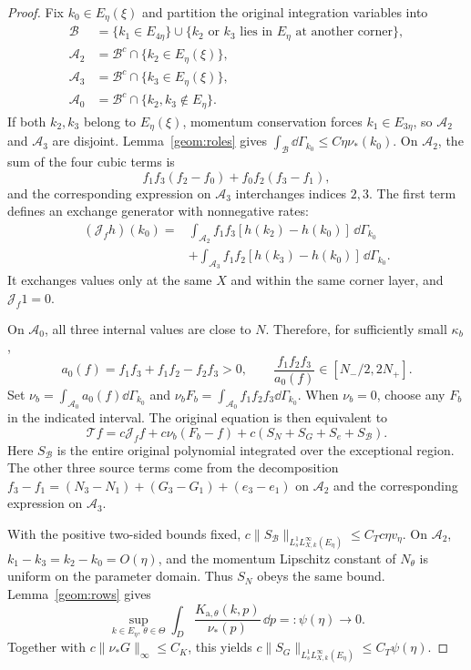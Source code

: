 \begin{proof}
 Fix $k_0\in E_\eta(\xi)$ and partition the original integration
 variables into
 \begin{align*}
 \mathcal B&=\{k_1\in E_{4\eta}\}
       \cup\{k_2\text{ or }k_3\text{ lies in }E_\eta\text{ at another corner}\},\\
 \mathcal A_2&=\mathcal B^c\cap\{k_2\in E_\eta(\xi)\},\\
 \mathcal A_3&=\mathcal B^c\cap\{k_3\in E_\eta(\xi)\},\\
 \mathcal A_0&=\mathcal B^c\cap\{k_2,k_3\notin E_\eta\}.
 \end{align*}
 If both $k_2,k_3$ belong to $E_\eta(\xi)$, momentum conservation forces
 $k_1\in E_{3\eta}$, so $\mathcal A_2$ and $\mathcal A_3$ are disjoint.
 Lemma~\ref{geom:roles} gives
 $\int_{\mathcal B}\dd\Gamma_{k_0}\le C\eta\nu_*(k_0)$.
 On $\mathcal A_2$, the sum of the four cubic terms is
 \[
 f_1f_3(f_2-f_0)+f_0f_2(f_3-f_1),
 \]
 and the corresponding expression on $\mathcal A_3$ interchanges
 indices $2,3$. The first term defines an exchange generator with
 nonnegative rates:
 \begin{align*}
 (\mathcal J_f h)(k_0)
  ={}&\int_{\mathcal A_2}f_1f_3[h(k_2)-h(k_0)]\,\dd\Gamma_{k_0}\\
    &+\int_{\mathcal A_3}f_1f_2[h(k_3)-h(k_0)]\,\dd\Gamma_{k_0}.
 \end{align*}
 It exchanges values only at the same $X$ and within the same corner
 layer, and $\mathcal J_f1=0$.

 On $\mathcal A_0$, all three internal values are close to $N$.
 Therefore, for sufficiently small $\kappa_b$,
 \[
 a_0(f)=f_1f_3+f_1f_2-f_2f_3>0,
 \qquad \frac{f_1f_2f_3}{a_0(f)}\in[N_-/2,2N_+].
 \]
 Set $\nu_b=\int_{\mathcal A_0}a_0(f)\dd\Gamma_{k_0}$ and
 $\nu_b F_b=\int_{\mathcal A_0}f_1f_2f_3\dd\Gamma_{k_0}$.
 When $\nu_b=0$, choose any $F_b$ in the indicated interval.
 The original equation is then equivalent to
 \begin{equation}\label{hyd:positive-exchange}
 \mathcal T f=c\mathcal J_f f+c\nu_b(F_b-f)
                       +c(S_N+S_G+S_e+S_{\mathcal B}).
 \end{equation}
 Here $S_{\mathcal B}$ is the entire original polynomial integrated
 over the exceptional region. The other three source terms come from
 the decomposition
 $f_3-f_1=(N_3-N_1)+(G_3-G_1)+(e_3-e_1)$ on $\mathcal A_2$ and the
 corresponding expression on $\mathcal A_3$.

 With the positive two-sided bounds fixed,
 $c\|S_{\mathcal B}\|_{L^1_sL^\infty_{X,k}(E_\eta)}
 \le C_Tc\eta v_\eta$. On $\mathcal A_2$,
 $k_1-k_3=k_2-k_0=O(\eta)$, and the momentum Lipschitz constant of
 $N_\theta$ is uniform on the parameter domain. Thus $S_N$ obeys the
 same bound. Lemma~\ref{geom:rows} gives
 \[
 \sup_{k\in E_\eta,\,\theta\in\Theta}
    \int_D\frac{K_{\mathrm a,\theta}(k,p)}{\nu_*(p)}\,\dd p
       =:\psi(\eta)\longrightarrow0.
 \]
 Together with $c\|\nu_*G\|_\infty\le C_K$, this yields
 $c\|S_G\|_{L^1_sL^\infty_{X,k}(E_\eta)}\le C_T\psi(\eta)$.


\end{proof}
